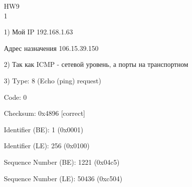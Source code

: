 \documentclass[a4paper,11pt]{article}
\begin{document}
\Large
HW9
\\
1

\begin{center}
\label{fig:image}
\end{center}
1) Мой IP 192.168.1.63

Адрес назначения	106.15.39.150

2) Так как ICMP - сетевой уровень, а порты на транспортном


\begin{center}
\label{fig:image}
\end{center}
3) Type: 8 (Echo (ping) request)

Code: 0

Checksum: 0x4896 [correct]

Identifier (BE): 1 (0x0001)

Identifier (LE): 256 (0x0100)

Sequence Number (BE): 1221 (0x04c5)

Sequence Number (LE): 50436 (0xc504)
\end{document}

